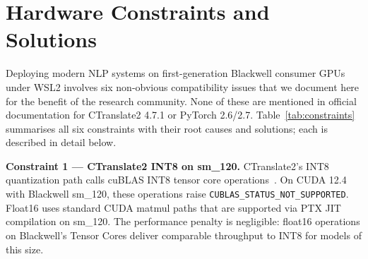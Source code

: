 \documentclass[conference]{IEEEtran}
\begin{document}
\section{Hardware Constraints and Solutions}
\label{sec:constraints}

Deploying modern NLP systems on first-generation Blackwell consumer GPUs under
WSL2 involves six non-obvious compatibility issues that we document here for
the benefit of the research community. None of these are mentioned in official
documentation for CTranslate2 4.7.1 or PyTorch 2.6/2.7.
Table~\ref{tab:constraints} summarises all six constraints with their root causes
and solutions; each is described in detail below.

\begin{table}[htbp]
\caption{Hardware Constraints and Solutions.}
\label{tab:constraints}
\centering
{}
\end{table}

\textbf{Constraint 1 --- CTranslate2 INT8 on sm\_120.}
CTranslate2's INT8 quantization path calls cuBLAS INT8 tensor core operations~\cite{dettmers2022llmint8}.
On CUDA 12.4 with Blackwell sm\_120, these operations raise
\texttt{CUBLAS\_STATUS\_NOT\_SUPPORTED}. Float16 uses standard CUDA matmul
paths that are supported via PTX JIT compilation on sm\_120.
The performance penalty is negligible: float16 operations on Blackwell's
Tensor Cores deliver comparable throughput to INT8 for models of this size.
\end{document}
